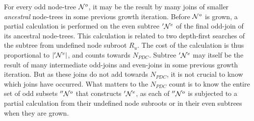 For every odd node-tree $\mathcal{N}^o$, it may be the result by many joins of smaller \emph{ancestral} node-trees in some previous growth iteration. Before $\mathcal{N}^o$ is grown, a partial calculation is performed on the even subtree $'\mathcal{N}^e$ of the final odd-join of its ancestral node-trees. This calculation is related to two depth-first searches of the subtree from undefined node subroot $R_u$. The cost of the calculation is thus proportional to $|'\mathcal{N}^e|$, and counts towards $N_{PDC}$. Subtree $'\mathcal{N}^e$ may itself be the result of many intermediate odd-joins and even-joins in some previous growth iteration. But as these joins do not add towards $N_{PDC}$, it is not crucial to know which joins have occurred. What matters to the $N_{PDC}$ count is to know the entire set of odd subsets $''\mathcal{N}^o$ that constructs $'\mathcal{N}^e$, as each of $''\mathcal{N}^o$ is subjected to a partial calculation from their undefined node subroots or in their even subtrees when they are grown.

